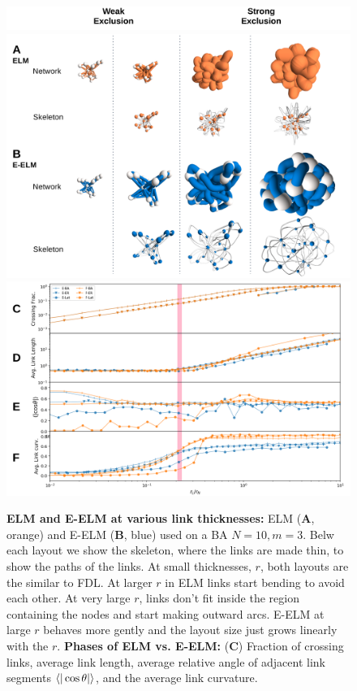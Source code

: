 \documentclass[nofootinbib,preprint,floatfix,titlepage,endfloats]{revtex4} %
\begin{document}
{\begin{figure}
\begin{tabular}{ll}
    \end{tabular}
    \label{fig:phase-compare}
\end{figure}
}%
%
\begin{figure}
\centering
\vspace{2cm}
\includegraphics[width=.7\columnwidth]{fig-09-19/weak-strong.png}
\includegraphics[width=.7\columnwidth]{fig-09-19/phase-net-skl-2.png}
\includegraphics[width=.7\columnwidth]{fig-09-19/phase-cur-2.png}
\caption{%
         \scriptsize {\bf ELM and E-ELM at various link thicknesses:} ELM ({\bf A}, orange) and E-ELM ({\bf B}, blue) used on a BA $N=10, m=3$. Belw each layout we show the skeleton, where the links are made thin, to show the paths of the links.
         At small thicknesses, $r$, both layouts are the similar to FDL. At larger $r$ in ELM links start bending to avoid each other. At very large $r$, links don't fit inside the region containing the nodes and start making outward arcs. E-ELM at large $r$ behaves more gently and the layout size just grows linearly with the $r$.
         {\bf Phases of ELM vs. E-ELM:} ({\bf C})
         Fraction of crossing links, average link length, average relative angle of adjacent link segments $\be{|\cos\theta |}$, and the average link curvature. 
}
\end{figure}
\end{document}
